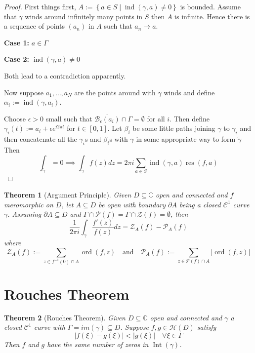 \documentclass[11pt]{article}
\newcommand{\defeq}{:=}
\newcommand{\abs}[1]{\left|#1\right|}
\DeclareMathOperator{\ord}{\text{ord}}
\DeclareMathOperator{\ind}{\text{ind}}
\DeclareMathOperator{\res}{\text{res}}
\DeclareMathOperator{\Int}{\text{Int}}
\newcommand{\relmiddle}[1]{\mathrel{}\middle#1\mathrel{}}
\newcommand{\rmv}{\relmiddle|}
\newcommand{\C}{\mathbb{C}}
\newtheorem{theorem}{Theorem}[section]
\begin{document}
\begin{proof}
First things first, $A\defeq\left\{a \in S \rmv \ind(\gamma, a)\neq 0 \right\}$ is bounded.
Assume that $\gamma$ winds around infinitely many points in $S$ then $A$ is infinite.
Hence there is a sequence of points $(a_n)$ in $A$ such that $a_n\to a$.

\textbf{Case 1:} $a\in\Gamma$

\textbf{Case 2:} $\ind(\gamma, a)\neq 0$

Both lead to a contradiction apparently.

Now suppose $a_1, \dots, a_N$ are the points around with $\gamma$ winds and define $\alpha_i\defeq\ind(\gamma,a_i)$.

Choose $\epsilon >0$ small such that $\overline{\mathcal{B}_\epsilon(a_i)}\cap\Gamma=\emptyset$ for all $i$.
Then define $\gamma_i(t)\defeq a_i+\epsilon e^{i 2 \pi t}$ for $t\in [0, 1]$.
Let $\beta_i$ be some little paths joining $\gamma$ to $\gamma_i$ and then concatenate all the $\gamma_i$s and $\beta_i$s with $\gamma$ in some appropriate way to form $\widetilde{\gamma}$
Then 
\[
	\int_{\widetilde{\gamma}}=0\implies\int_\gamma f(z)dz = 2\pi i \sum_{a\in S}\ind(\gamma, a)\res(f, a)
\]
\end{proof}

\begin{theorem}[Argument Principle]
Given $D\subseteq\C$ open and connected and $f$ meromorphic on $D$, let $A\subseteq D$ be open with boundary $\partial A$ being a closed $\mathcal{C}^1$ curve $\gamma$.
Assuming $\partial A \subseteq D$ and $\Gamma\cap\mathcal{P}(f)=\Gamma\cap\mathcal{Z}(f)=\emptyset$, then
\[
	\frac{1}{2\pi i}\int_\gamma \frac{f'(z)}{f(z)}dz = \mathcal{Z}_A(f)-\mathcal{P}_A(f)
\]
where
\[
	\mathcal{Z}_A(f)\defeq\sum_{z\in f^{-1}(0)\cap A}\ord(f, z) \quad \text{and} \quad \mathcal{P}_A(f)\defeq\sum_{z\in\mathcal{P}(f)\cap A}\abs{\ord(f, z)}
\]
\end{theorem}

\section{Rouches Theorem}

\begin{theorem}[Rouches Theorem]
Given $D\subseteq\C$ open and connected and $\gamma$ a closed $\mathcal{C}^1$ curve with $\Gamma=im(\gamma)\subseteq D$.
Suppose $f,g\in\mathcal{H}(D)$ satisfy
\begin{equation}
	\abs{f(\xi)-g(\xi)} < \abs{g(\xi)}\quad\forall\xi\in\Gamma	
	\label{eq:roche}
\end{equation}
Then $f$ and $g$ have the same number of zeros in $\Int(\gamma)$.
\end{theorem}
\end{document}
